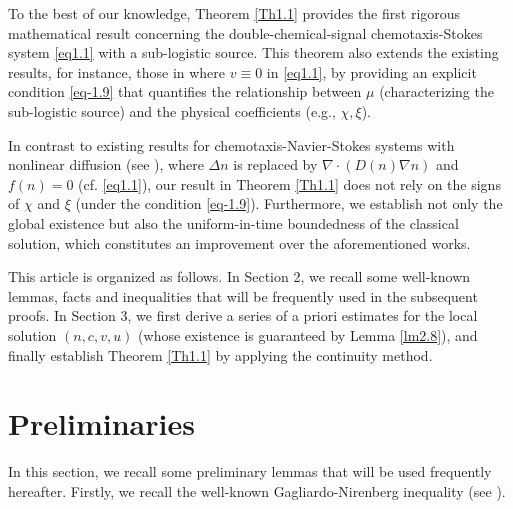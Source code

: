 \documentclass[10pt,a4paper]{amsart}
\numberwithin{equation}{section}
\newtheorem{remark}[theo]{Remark}
\begin{document}
To the best of our knowledge, Theorem \ref{Th1.1} provides the first rigorous 
mathematical result concerning the double-chemical-signal chemotaxis-Stokes system 
\eqref{eq1.1} with a sub-logistic source. This theorem also extends the existing results, 
for instance, those in \cite{ma} where $v\equiv0$ in \eqref{eq1.1}, by providing an 
explicit condition \eqref{eq-1.9} that quantifies the relationship between 
$\mu$ (characterizing the sub-logistic source) and the physical coefficients (e.g., 
$\chi, \xi$).

In contrast to existing results for chemotaxis-Navier-Stokes systems with nonlinear 
diffusion (see \cite{Luo}), where $\Delta n$ is replaced by $\nabla\cdot (D(n)\nabla n)$ 
and $f(n)=0$ (cf. \eqref{eq1.1}), our result in Theorem \ref{Th1.1} does not rely on 
the signs of $\chi$ and $\xi$ (under the condition \eqref{eq-1.9}). Furthermore, 
we establish not only the global existence but also the uniform-in-time boundedness 
of the classical solution, which constitutes an improvement over the aforementioned
 works.

This article is organized as follows. 
In Section 2, we recall some well-known lemmas, facts and inequalities that will be 
frequently used in the subsequent proofs. 
In Section 3, we first derive a series of a priori estimates for the local solution
 \((n,c,v,u)\) (whose existence is guaranteed by Lemma \ref{lm2.8}), and finally 
establish Theorem \ref{Th1.1} by applying the continuity method.

\section{Preliminaries}

In this section, we recall some preliminary lemmas that will be used frequently 
hereafter.
Firstly, we recall the well-known Gagliardo-Nirenberg inequality 
(see \cite{Nirenberg-1959}).
\end{document}
